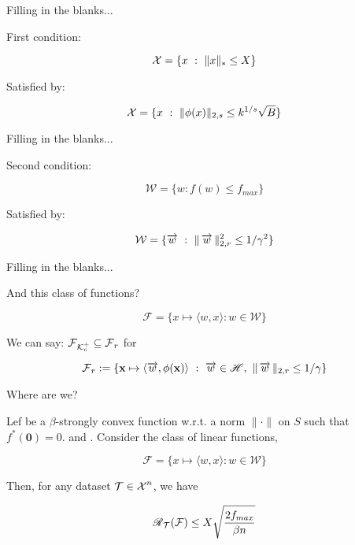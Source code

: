 \begin{frame}{Filling in the blanks...}

  First condition:
  
  \[ \operatorname{\mathcal{X}} = \{ x ~:~ \|x\|_* \leq X\} \]

  Satisfied by:

  \[ \operatorname{\mathcal{X}} = \{ x ~:~ \|\phi(x)\|_{2,s} \leq k^{1/s} \sqrt{B}\} \]

  
\end{frame}

\begin{frame}{Filling in the blanks...}

  Second condition:

  \[ \mathcal{W} = \{ w : f(w) \leq f_{max} \}  \]

  Satisfied by:
  
  \[ \mathcal{W} = \{ \operatorname{\overrightarrow{w}} ~:~ \| \operatorname{\overrightarrow{w}}\|^2_{2,r} \leq 1/\gamma^2 \}  \]
  
\end{frame}


\begin{frame}{Filling in the blanks...}

  And this class of functions?
  
  \[ \mathcal{F} = \{ x \mapsto \langle w,x \rangle : w \in \mathcal{W} \}  \]

  We can say: $ \operatorname{\mathcal{F}}_{\mathcal{K}^+_c} \subseteq \operatorname{\mathcal{F}}_r $ for

  \[ \operatorname{\mathcal{F}}_r := \{ \operatorname{\mathbf{x}} \mapsto \langle \operatorname{\overrightarrow{w}}, \phi(\operatorname{\mathbf{x}}) \rangle ~:~ \operatorname{\overrightarrow{w}} \in \operatorname{\mathscr{H}}, ~ \| \operatorname{\overrightarrow{w}} \|_{2,r} \leq 1/\gamma \} \]
  
  
\end{frame}



\begin{frame}{Where are we?}

  \begin{theorem}[9 Generalization]
    Lef  be a $\beta$-strongly convex function w.r.t. a norm $\|\cdot \|$ on $S$ such that
    $f^*(\mathbf{0}) = 0$.  and .
    Consider the class of linear functions,

    \[ \mathcal{F} = \{ x \mapsto \langle w,x \rangle : w \in \mathcal{W} \}\]

    Then, for any dataset $\mathcal{T} \in \operatorname{\mathcal{X}}^n$, we have

    \[ \operatorname{\mathscr{R}}_{\mathcal{T}}(\mathcal{F}) \leq X \sqrt{ \frac{2f_{max}}{\beta n}  } \]
  \end{theorem}
      
\end{frame}


